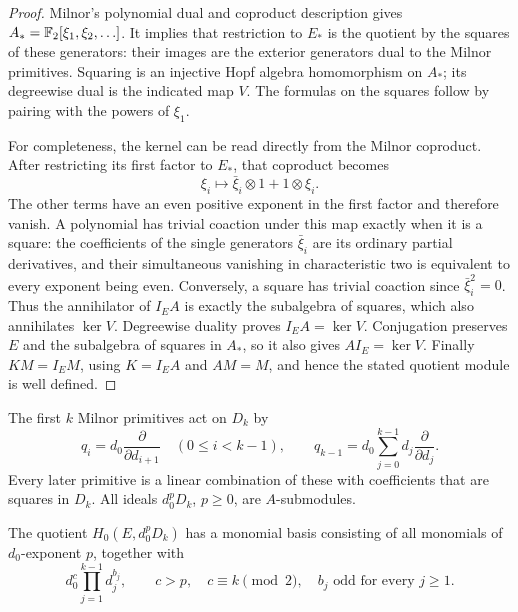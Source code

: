 \begin{proof}
Milnor's polynomial dual and coproduct description
\cite[\S5, Theorem~3, and Appendix~1]{Milnor1958} gives
$A_*=\mathbb F_2[\xi_1,\xi_2,\ldots]$. It implies that restriction to
$E_*$ is the quotient by the squares of these generators: their
images are the exterior generators dual to the Milnor primitives.
Squaring is an injective Hopf algebra
homomorphism on $A_*$; its degreewise dual is the indicated map $V$.
The formulas on the squares follow by pairing with the powers of
$\xi_1$.

For completeness, the kernel can be read directly from the Milnor
coproduct.  After restricting its first factor to $E_*$, that coproduct
becomes
\[
 \xi_i\longmapsto \bar\xi_i\otimes1+1\otimes\xi_i.
\]
The other terms have an even positive exponent in the first factor and
therefore vanish.  A polynomial has trivial coaction under this map
exactly when it is a square: the coefficients of the single generators
$\bar\xi_i$ are its ordinary partial derivatives, and their simultaneous
vanishing in characteristic two is equivalent to every exponent being
even.  Conversely, a square has trivial coaction since
$\bar\xi_i^2=0$.  Thus the annihilator of $I_EA$ is exactly the subalgebra
of squares, which also annihilates $\ker V$.  Degreewise duality proves
$I_EA=\ker V$.  Conjugation preserves $E$ and the subalgebra of squares
in $A_*$, so it also gives $AI_E=\ker V$.  Finally
$KM=I_EM$, using $K=I_EA$ and $AM=M$, and hence the stated quotient
module is well defined.
\end{proof}

\begin{lemma}\label{lem:milnor-coinvariants}
The first $k$ Milnor primitives act on $D_k$ by
\begin{equation}\label{eq:milnor-action}
 q_i=d_0\frac{\partial}{\partial d_{i+1}}\quad(0\leq i<k-1),
 \qquad
 q_{k-1}=d_0\sum_{j=0}^{k-1}d_j\frac{\partial}{\partial d_j}.
\end{equation}
Every later primitive is a linear combination of these with coefficients
that are squares in $D_k$.  All ideals $d_0^pD_k$, $p\geq0$, are $A$-submodules.

The quotient $H_0(E,d_0^pD_k)$ has a monomial basis consisting of all
monomials of $d_0$-exponent $p$, together with
\begin{equation}\label{eq:coinvariants}
 d_0^c\prod_{j=1}^{k-1}d_j^{b_j},\qquad
 c>p,\quad c\equiv k\pmod2,\quad b_j\text{ odd for every }j\geq1.
\end{equation}
\end{lemma}

